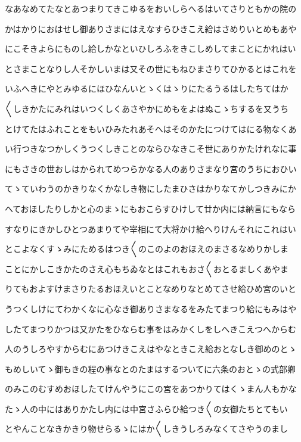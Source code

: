 \documentclass[a4paper,11pt,landscape]{ltjtarticle}
\begin{document}
なあなめてたなとあつまりてきこゆるをおいしらへるはいてさりともかの院の
\par\medskip
かはかりにおはせし御ありさまにはえなすらひきこえ給はさめりいとめもあや
\par\medskip
にこそきよらにものし給しかなといひしろふをきこしめしてまことにかれはい
\par\medskip
とさまことなりし人そかしいまは又その世にもねひまさりてひかるとはこれを
\par\medskip
いふへきにやとみゆるにほひなんいとゝくはゝりにたるうるはしたちてはか
\par\medskip
〱しきかたにみれはいつくしくあさやかにめもをよはぬこゝちするを又うち
\par\medskip
とけてたはふれことをもいひみたれあそへはそのかたにつけてはにる物なくあ
\par\medskip
い行つきなつかしくうつくしきことのならひなきこそ世にありかたけれなに事
\par\medskip
にもさきの世おしはかられてめつらかなる人のありさまなり宮のうちにおひい
\par\medskip
てゝていわうのかきりなくかなしき物にしたまひさはかりなてかしつきみにか
\par\medskip
へておほしたりしかと心のまゝにもおこらすひけして廿か内には納言にもなら
\par\medskip
すなりにきかしひとつあまりてや宰相にて大将かけ給へりけんそれにこれはい
\par\medskip
とこよなくすゝみにためるはつき〱のこのよのおほえのまさるなめりかしま
\par\medskip
ことにかしこきかたのさえ心もちゐなとはこれもおさ〱おとるましくあやま
\par\medskip
りてもおよすけまさりたるおほえいとことなめりなとめてさせ給ひめ宮のいと
\par\medskip
うつくしけにてわかくなに心なき御ありさまなるをみたてまつり給にもみはや
\par\medskip
したてまつりかつは又かたをひならむ事をはみかくしをしへきこえつへからむ
\par\medskip
人のうしろやすからむにあつけきこえはやなときこえ給おとなしき御めのとゝ
\par\medskip
もめしいてゝ御もきの程の事なとのたまはするついてに六条のおとゝの式部卿
\par\medskip
のみこのむすめおほしたてけんやうにこの宮をあつかりてはくゝまん人もかな
\par\medskip
たゝ人の中にはありかたし内には中宮さふらひ給つき〱の女御たちとてもい
\par\medskip
とやんことなきかきり物せらるゝにはか〱しきうしろみなくてさやうのまし
\end{document}
